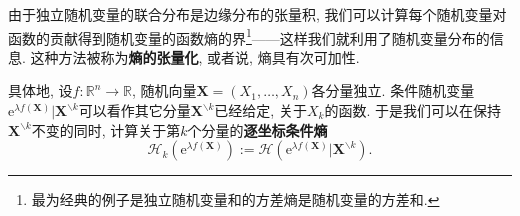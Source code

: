 由于独立随机变量的联合分布是边缘分布的张量积, 我们可以计算每个随机变量对函数的贡献得到随机变量的函数熵的界\footnote{最为经典的例子是独立随机变量和的方差熵是随机变量的方差和.}——这样我们就利用了随机变量分布的信息. 
这种方法被称为\textbf{熵的张量化}, 或者说, 熵具有次可加性.


具体地, 设$f \colon \mathbb{R}^n \to \mathbb{R}$, 随机向量$\bm{X} = (X_1, \dots, X_n)$各分量独立. 
条件随机变量$\mathrm{e}^{\lambda f(\bm{X})} | \bm{X}^{\backslash k}$可以看作其它分量$\bm{X}^{\backslash k}$已经给定, 关于$X_k$的函数. 
于是我们可以在保持$\bm{X}^{\backslash k}$不变的同时, 计算关于第$k$个分量的\textbf{逐坐标条件熵}
\begin{equation*}
	\mathcal{H}_k ( \mathrm{e}^{\lambda f(\bm{X})} )
	:= \mathcal{H} ( \mathrm{e}^{\lambda f(\bm{X})} | \bm{X}^{\backslash k} ). 
\end{equation*}

